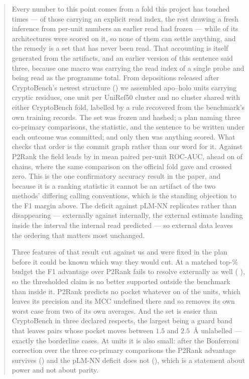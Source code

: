 \documentclass[11pt]{article}
\begin{document}
\begin{abstract}
Every number to this point comes from a fold this project has touched
\NFoldAccesses{} times --- \NIndexedReads{} of those carrying an explicit read
index, the rest drawing a fresh inference from per-unit numbers an earlier read
had frozen --- while \NArchOnFold{} of its architectures were scored on it, so
none of them can settle anything, and the remedy is a set that has never been
read. That accounting is itself generated from the artifacts, and an earlier
version of this sentence said three, because one macro was carrying the read
index of a single probe and being read as the programme total. From
depositions released after CryptoBench's newest structure (\ExtCutoff{}) we
assembled \ExtN{} apo--holo units carrying \ExtNPositives{} cryptic residues,
one unit per UniRef50 cluster and no cluster shared with either CryptoBench
fold, labelled by a rule recovered from the benchmark's own training records.
The set was frozen and hashed; a plan naming three co-primary comparisons, the
statistic, and the sentence to be written under each outcome was committed; and
only then was anything scored. What checks that order is the commit graph rather
than our word for it. Against P2Rank the field leads by \ExtAucPtwoR{}
\ExtAucCIPtwoR{} in mean paired per-unit ROC-AUC, ahead on \ExtWinPtwoR{} of
\ExtN{} chains, where the same comparison on the official fold gave
\ExtOldPtwoR{} and crossed zero. This is the one confirmatory accuracy result in
the paper, and because it is a ranking statistic it cannot be an artifact of the
two methods' differing calling conventions, which is the standing objection to
the F1 margin above. The deficit against pLM-NN replicates rather than
disappearing --- \ExtAucPlm{} \ExtAucCIPlm{} externally against \ExtOldPlm{}
internally, the external estimate landing inside the interval the internal read
predicted --- so external data leaves the ordering that matters most unchanged.

Three features of that result cut against us and were fixed in the plan before
it could be known which way they would cut. At a matched top-\ExtQPct{}\% budget
the F1 advantage over P2Rank fails to resolve externally as well
(\ExtBudgetFDelta{} \ExtBudgetFCI{}), so the thresholded claim is no better
supported outside the benchmark than inside it. P2Rank predicts no pocket
whatever on \ExtAbstain{} of the \ExtN{} units, which leaves its precision and
its MCC undefined there and so removes its own worst case from two of its own
averages. And the set is easier than CryptoBench in three declared respects, the
largest being a guard band that leaves pairs whose pocket moves between
\(1.5\) and \(2.5\)~\AA{} unlabelled --- exactly the borderline cases. At
\ExtN{} units it is also small: after the Bonferroni correction over the three
co-primary comparisons the P2Rank advantage survives (\ExtAucBonfPtwoR{}) and
the pLM-NN deficit does not (\ExtAucBonfPlm{}), which is a statement about power
and not about parity.


\end{abstract}
\end{document}
